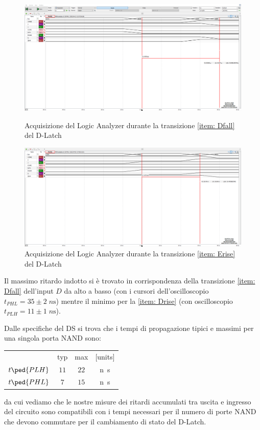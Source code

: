 \documentclass[10pt, a4paper, italian]{article}
\begin{document}
\begin{figure}[htbp]
    \centering
    \includegraphics[width=\textwidth]{dlatch_Dfall40}
    \caption{Acquisizione del Logic Analyzer durante la transizione
    \ref{item: Dfall} del D-Latch \label{fig: Dfall}}
    \includegraphics[width=\textwidth]{dlatch_Erise}
    \caption{Acquisizione del Logic Analyzer durante la transizione
    \ref{item: Erise} del D-Latch \label{fig: Erise}}
\end{figure}

Il massimo ritardo indotto si è trovato in corrispondenza della transizione
\ref{item: Dfall} dell'input $D$ da alto a basso (con i cursori
dell'oscilloscopio $t_{PHL} = 35 \pm 2 \; \si{n\s}$) mentre il minimo per la
\ref{item: Drise} (con oscilloscopio $t_{PLH} = 11 \pm 1 \; \si{n\s}$).

Dalle specifiche del DS si trova che i tempi di propagazione tipici e massimi
per una singola porta NAND sono:
\begin{table}[htbp]
\centering
\begin{tabular}{cccc}
	& typ & max & [units] \\
    $t\ped{PLH}$ & $11$ & $22$ & \si{n\s} \\
    $t\ped{PHL}$ & $7$ & $15$ & \si{n\s}
\end{tabular}
\end{table}
da cui vediamo che le nostre misure dei ritardi accumulati tra uscita e
ingresso del circuito sono compatibili con i tempi necessari per il numero di
porte NAND che devono commutare per il cambiamento di stato del D-Latch.
\end{document}
